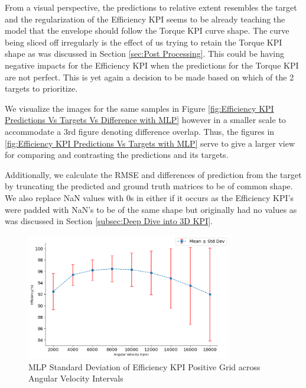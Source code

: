 \documentclass{report} %
\begin{document}
From a visual perspective, the predictions to relative extent resembles the target and the regularization of the Efficiency \ac{KPI} seems to be already teaching 
the model that the envelope should follow the Torque \ac{KPI} curve shape.  
The curve being sliced off irregularly is the effect of us trying to retain the Torque \ac{KPI} shape as was discussed in Section \ref{sec:Post Processing}.
This could be having negative impacts for the Efficiency \ac{KPI}  when the predictions for the Torque \ac{KPI} are not perfect.
This is yet again a decision to be made based on which of the 2 targets to prioritize. 

We visualize the images for the same samples in Figure \ref{fig:Efficiency KPI Predictions Vs Targets Vs Difference with MLP} however in a smaller scale to accommodate 
a 3rd figure denoting difference overlap. Thus, the figures in \ref{fig:Efficiency KPI Predictions Vs Targets with MLP} serve to give a larger view for comparing and 
contrasting the predictions and its targets.

Additionally, we calculate the RMSE and differences of prediction from the target by truncating the predicted and ground truth matrices to be of common shape.
We also replace \ac{NaN} values with 0s in either if it occurs as the Efficiency \ac{KPI}'s were padded with \ac{NaN}'s to be of the same shape but originally 
had no values as was discussed in Section \ref{subsec:Deep Dive into 3D KPI}.

\begin{figure}[H]
    \centering
    \includegraphics[width=0.8\textwidth]{./ReportImages/stddev_y2_nn_MLP.png} 
    \caption{\ac{MLP} Standard Deviation of Efficiency \ac{KPI} Positive Grid across Angular Velocity Intervals} 
    \label{fig:MLP Standard Deviation of 3D KPI(Efficiency) Positive Grid across Angular Velocity Intervals}
\end{figure}
\end{document}
